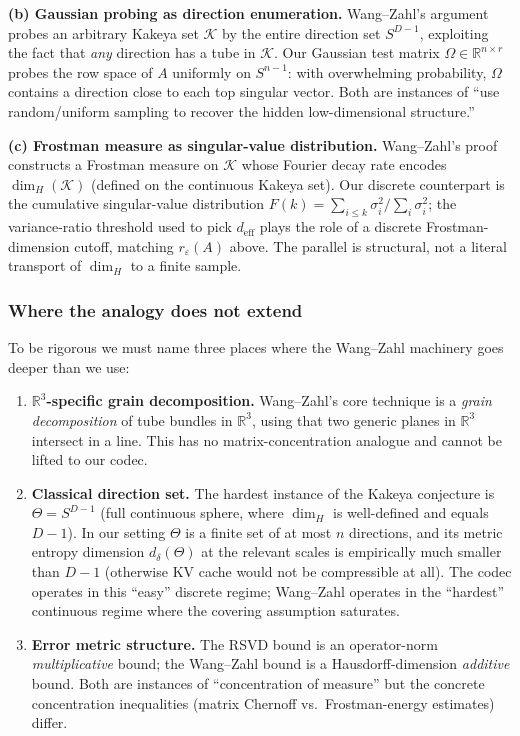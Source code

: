\documentclass[11pt,a4paper]{article}
\theoremstyle{definition}
\theoremstyle{plain}
\newcommand{\R}{\mathbb{R}}
\begin{document}
\textbf{(b) Gaussian probing as direction enumeration.}
Wang--Zahl's argument probes an arbitrary Kakeya set $\mathcal{K}$ by the entire direction set $S^{D-1}$, exploiting the fact that \emph{any} direction has a tube in $\mathcal{K}$. Our Gaussian test matrix $\Omega \in \R^{n \times r}$ probes the row space of $A$ uniformly on $S^{n-1}$: with overwhelming probability, $\Omega$ contains a direction close to each top singular vector. Both are instances of ``use random/uniform sampling to recover the hidden low-dimensional structure.''

\textbf{(c) Frostman measure as singular-value distribution.}
Wang--Zahl's proof constructs a Frostman measure on $\mathcal{K}$ whose Fourier decay rate encodes $\dim_H(\mathcal{K})$ (defined on the continuous Kakeya set). Our discrete counterpart is the cumulative singular-value distribution $F(k) = \sum_{i \leq k} \sigma_i^2 / \sum_i \sigma_i^2$; the variance-ratio threshold used to pick $d_{\text{eff}}$ plays the role of a discrete Frostman-dimension cutoff, matching $r_\varepsilon(A)$ above. The parallel is structural, not a literal transport of $\dim_H$ to a finite sample.

\subsubsection*{Where the analogy does not extend}

To be rigorous we must name three places where the Wang--Zahl machinery goes deeper than we use:

\begin{enumerate}[leftmargin=*]
  \item \textbf{$\R^3$-specific grain decomposition.} Wang--Zahl's core technique is a \emph{grain decomposition} of tube bundles in $\R^3$, using that two generic planes in $\R^3$ intersect in a line. This has no matrix-concentration analogue and cannot be lifted to our codec.
  \item \textbf{Classical direction set.} The hardest instance of the Kakeya conjecture is $\Theta = S^{D-1}$ (full continuous sphere, where $\dim_H$ is well-defined and equals $D - 1$). In our setting $\Theta$ is a finite set of at most $n$ directions, and its metric entropy dimension $d_\delta(\Theta)$ at the relevant scales is empirically much smaller than $D - 1$ (otherwise KV cache would not be compressible at all). The codec operates in this ``easy'' discrete regime; Wang--Zahl operates in the ``hardest'' continuous regime where the covering assumption saturates.
  \item \textbf{Error metric structure.} The RSVD bound is an operator-norm \emph{multiplicative} bound; the Wang--Zahl bound is a Hausdorff-dimension \emph{additive} bound. Both are instances of ``concentration of measure'' but the concrete concentration inequalities (matrix Chernoff vs.\ Frostman-energy estimates) differ.
\end{enumerate}
\end{document}
